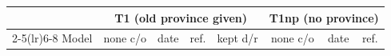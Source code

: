 \begin{tabular}{@{}l ccc c ccc@{}}
\toprule
 & \multicolumn{4}{c}{T1 (old province given)} & \multicolumn{3}{c}{T1np (no province)} \\
\cmidrule(lr){2-5}\cmidrule(lr){6-8}
Model & none c/o & date & ref. & kept d/r & none c/o & date & ref. \\
\midrule
\bottomrule
\end{tabular}
